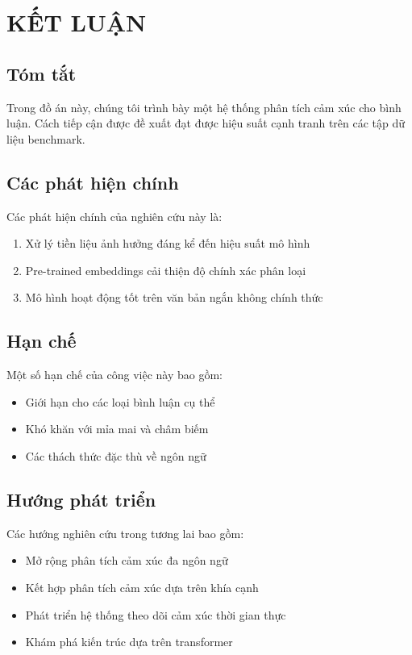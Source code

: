 \chapter{KẾT LUẬN}
\label{chap:conclusion}

\section{Tóm tắt}

Trong đồ án này, chúng tôi trình bày một hệ thống phân tích cảm xúc cho bình luận. Cách tiếp cận được đề xuất đạt được hiệu suất cạnh tranh trên các tập dữ liệu benchmark.

\section{Các phát hiện chính}

Các phát hiện chính của nghiên cứu này là:
\begin{enumerate}
    \item Xử lý tiền liệu ảnh hưởng đáng kể đến hiệu suất mô hình
    \item Pre-trained embeddings cải thiện độ chính xác phân loại
    \item Mô hình hoạt động tốt trên văn bản ngắn không chính thức
\end{enumerate}

\section{Hạn chế}

Một số hạn chế của công việc này bao gồm:
\begin{itemize}
    \item Giới hạn cho các loại bình luận cụ thể
    \item Khó khăn với mỉa mai và châm biếm
    \item Các thách thức đặc thù về ngôn ngữ
\end{itemize}

\section{Hướng phát triển}

Các hướng nghiên cứu trong tương lai bao gồm:
\begin{itemize}
    \item Mở rộng phân tích cảm xúc đa ngôn ngữ
    \item Kết hợp phân tích cảm xúc dựa trên khía cạnh
    \item Phát triển hệ thống theo dõi cảm xúc thời gian thực
    \item Khám phá kiến trúc dựa trên transformer
\end{itemize}
